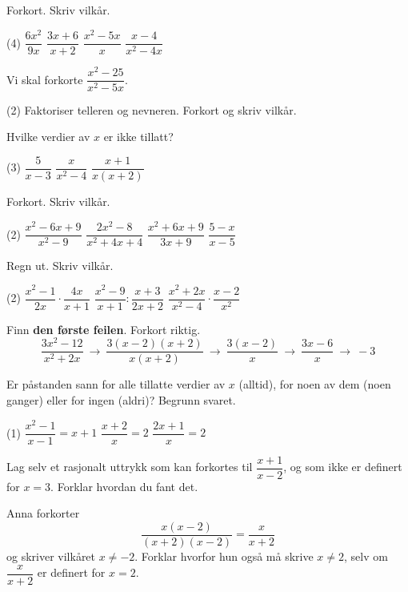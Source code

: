 
Forkort. Skriv vilkår.
\begin{tasks}(4)
  \task $\dfrac{6x^2}{9x}$
  \task $\dfrac{3x+6}{x+2}$
  \task $\dfrac{x^2-5x}{x}$
  \task $\dfrac{x-4}{x^2-4x}$
\end{tasks}

Vi skal forkorte $\dfrac{x^2-25}{x^2-5x}$.
\begin{tasks}(2)
  \task Faktoriser telleren og nevneren.
  \task Forkort og skriv vilkår.
\end{tasks}

Hvilke verdier av $x$ er ikke tillatt?
\begin{tasks}(3)
  \task $\dfrac{5}{x-3}$
  \task $\dfrac{x}{x^2-4}$
  \task $\dfrac{x+1}{x(x+2)}$
\end{tasks}


Forkort. Skriv vilkår.
\begin{tasks}(2)
  \task $\dfrac{x^2-6x+9}{x^2-9}$
  \task $\dfrac{2x^2-8}{x^2+4x+4}$
  \task $\dfrac{x^2+6x+9}{3x+9}$
  \task $\dfrac{5-x}{x-5}$
\end{tasks}

Regn ut. Skriv vilkår.
\begin{tasks}(2)
  \task $\dfrac{x^2-1}{2x} \cdot \dfrac{4x}{x+1}$
  \task $\dfrac{x^2-9}{x+1} : \dfrac{x+3}{2x+2}$
  \task $\dfrac{x^2+2x}{x^2-4} \cdot \dfrac{x-2}{x^2}$
\end{tasks}

Finn \textbf{den første feilen}. Forkort riktig.
\[ \frac{3x^2-12}{x^2+2x} \ \longrightarrow\ \frac{3(x-2)(x+2)}{x(x+2)} \ \longrightarrow\ \frac{3(x-2)}{x} \ \longrightarrow\ \frac{3x-6}{x} \ \longrightarrow\ -3 \]


Er påstanden sann for alle tillatte verdier av $x$ (alltid), for noen av dem (noen ganger) eller for ingen (aldri)? Begrunn svaret.
\begin{tasks}(1)
  \task $\dfrac{x^2-1}{x-1} = x+1$
  \task $\dfrac{x+2}{x} = 2$
  \task $\dfrac{2x+1}{x} = 2$
\end{tasks}

Lag selv et rasjonalt uttrykk som kan forkortes til $\dfrac{x+1}{x-2}$, og som ikke er definert for $x = 3$.
Forklar hvordan du fant det.

Anna forkorter
\[ \frac{x(x-2)}{(x+2)(x-2)} = \frac{x}{x+2} \]
og skriver vilkåret $x \neq -2$.
Forklar hvorfor hun også må skrive $x \neq 2$, selv om $\dfrac{x}{x+2}$ er definert for $x = 2$.

